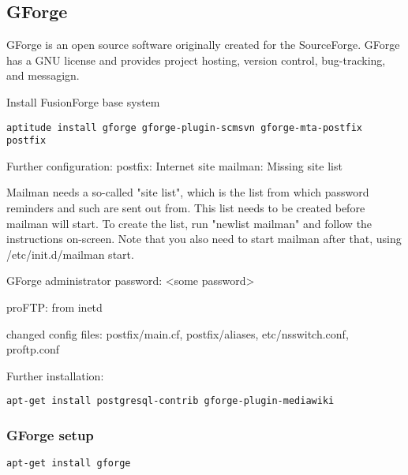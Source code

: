 \documentclass[a4paper]{article}
\begin{document}
\subsection{GForge}

GForge is an open source software originally created for the
SourceForge. GForge has a GNU license and provides project hosting,
version control, bug-tracking, and messagign.

Install FusionForge base system

\begin{lstlisting}[frame=single, framerule=0.95pt]
aptitude install gforge gforge-plugin-scmsvn gforge-mta-postfix postfix
\end{lstlisting}

\par
Further configuration: 
postfix: Internet site 
mailman: Missing site list 

Mailman needs a so-called "site list", which is the list from
which password reminders and such are sent out from.  This list
needs to be created before mailman will start. To create
the list, run "newlist mailman" and follow the instructions on-screen.
Note that you also need to start mailman after that, using
/etc/init.d/mailman start.

GForge administrator password: \textless some password\textgreater


proFTP: from inetd

changed config files: postfix/main.cf, postfix/aliases, etc/nsswitch.conf, proftp.conf

Further installation: 

\begin{lstlisting}[frame=single, framerule=0.95pt]
apt-get install postgresql-contrib gforge-plugin-mediawiki
\end{lstlisting}


\subsubsection{GForge setup}

\begin{lstlisting}[frame=single, framerule=0.95pt]
apt-get install gforge
\end{lstlisting}
\end{document}
